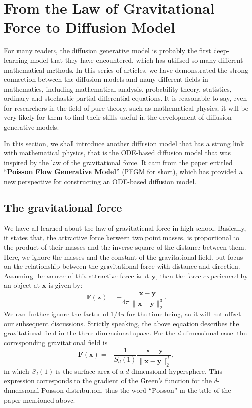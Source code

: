 \section{From the Law of Gravitational Force to Diffusion Model}
\label{sect_13_gravity}

For many readers, the diffusion generative model is probably the first deep-learning model that they have encountered, which has utilised so many different mathematical methods. In this series of articles, we have demonstrated the strong connection between the diffusion models and many different fields in mathematics, including mathematical analysis, probability theory, statistics, ordinary and stochastic partial differential equations. It is reasonable to say, even for researchers in the field of pure theory, such as mathematical physics, it will be very likely for them to find their skills useful in the development of diffusion generative models. 

In this section, we shall introduce another diffusion model that has a strong link with mathematical physics, that is the ODE-based diffusion model that was inspired by the law of the gravitational force. It cam from the paper entitled ``\textbf{Poisson Flow Generative Model}''\cite{xu2022poisson} (PFGM for short), which has provided a new perspective for constructing an ODE-based diffusion model.

\subsection{The gravitational force}

We have all learned about the law of gravitational force in high school. Basically, it states that, the attractive force between two point masses, is proportional to the product of their masses and the inverse square of the distance between them. Here, we ignore the masses and the constant of the gravitational field, but focus on the relationship between the gravitational force with distance and direction. Assuming the source of this attractive force is at $\bm{y}$, then the force experienced by an object at $\bm{x}$ is given by:
\begin{equation}
    \label{eq:13.1}
    \bm{F}(\bm{x})=-\frac{1}{4\pi}\frac{\bm{x}-\bm{y}}{\|\bm{x}-\bm{y}\|_2^3}.
\end{equation}
We can further ignore the factor of $1/4\pi$ for the time being, as it will not affect our subsequent discussions. Strictly speaking, the above equation describes the gravitational field in the three-dimensional space. For the $d$-dimensional case, the corresponding gravitational field is 
\begin{equation}
    \label{eq:13.2}
    \bm{F}(\bm{x})=-\frac{1}{S_d (1)}\frac{\bm{x}-\bm{y}}{\|\bm{x}-\bm{y}\|_2^d},
\end{equation}
in which $S_d(1)$ is the surface area of a $d$-dimensional hypersphere. This expression corresponds to the gradient of the Green's function for the $d$-dimensional Poisson distribution, thus the word ``Poisson'' in the title of the paper mentioned above. 

